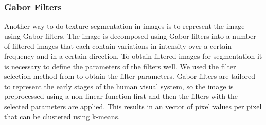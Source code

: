 \documentclass[pdftex,12pt,a4paper]{report}
\begin{document}
\subsubsection{Gabor Filters}

Another way to do texture segmentation in images is to represent the image using Gabor filters. The image is decomposed using Gabor filters into a number of filtered images that each contain variations in intensity over a certain frequency and in a certain direction. To obtain filtered images for segmentation it is necessary to define the parameters of the filters well. We used the filter selection method from \cite{jain1990unsupervised} to obtain the filter parameters. Gabor filters are tailored to represent the early stages of the human visual system, so the image is preprocessed using a non-linear function first and then the filters with the selected parameters are applied. This results in an vector of pixel values per pixel that can be clustered using k-means.
\end{document}
